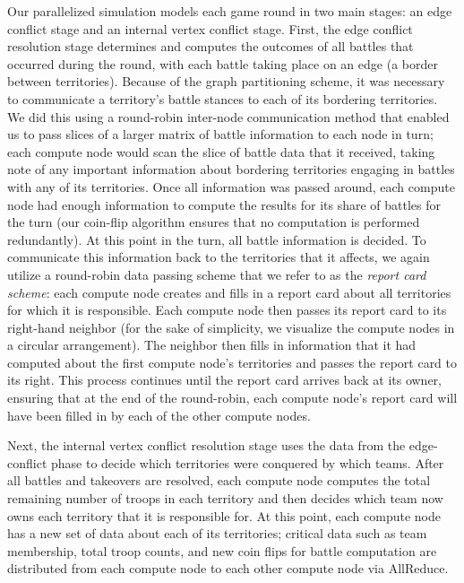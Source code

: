 \documentclass[10pt]{article}
\begin{document}
\begin{multicols}{2}
		Our parallelized simulation models each game round in two main stages: an edge conflict stage and an internal vertex conflict stage.
		First, the edge conflict resolution stage determines and computes the outcomes of all battles that occurred during the round, with each battle taking place on an edge (a border between territories). 
		Because of the graph partitioning scheme, it was necessary to communicate a territory's battle stances to each of its bordering territories.  
		We did this using a round-robin inter-node communication method that enabled us to pass slices of a larger matrix of battle information to each node in turn; each compute node would scan the slice of battle data that it received, taking note of any important information about bordering territories engaging in battles with any of its territories.  
		Once all information was passed around, each compute node had enough information to compute the results for its share of battles for the turn (our coin-flip algorithm ensures that no computation is performed redundantly).  
		At this point in the turn, all battle information is decided. 
		To communicate this information back to the territories that it affects, we again utilize a round-robin data passing scheme that we refer to as the \emph{report card scheme}: each compute node creates and fills in a report card about all territories for which it is responsible.
		Each compute node then passes its report card to its right-hand neighbor (for the sake of simplicity, we visualize the compute nodes in a circular arrangement).  
		The neighbor then fills in information that it had computed about the first compute node's territories and passes the report card to its right. 
		This process continues until the report card arrives back at its owner, ensuring that at the end of the round-robin, each compute node's report card will have been filled in by each of the other compute nodes.
		
		Next, the internal vertex conflict resolution stage uses the data from the edge-conflict phase to decide which territories were conquered by which teams. 
		After all battles and takeovers are resolved, each compute node computes the total remaining number of troops in each territory and then decides which team now owns each territory that it is responsible for.
		At this point, each compute node has a new set of data about each of its territories; critical data such as team membership, total troop counts, and new coin flips for battle computation are distributed from each compute node to each other compute node via AllReduce.


\end{multicols}
\end{document}
